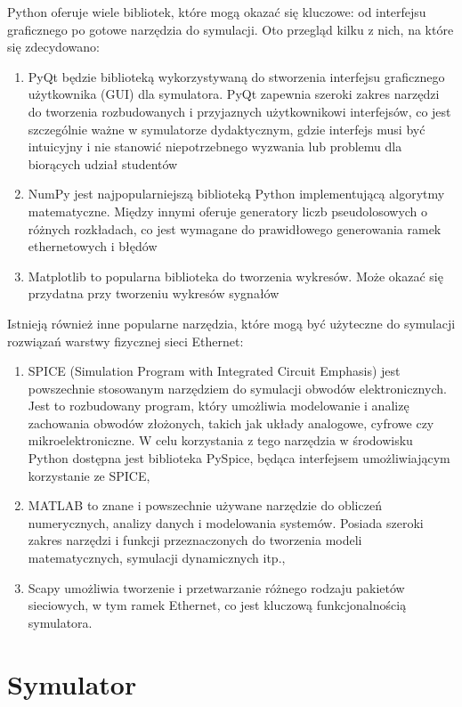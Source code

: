 Python oferuje wiele bibliotek, które mogą okazać się kluczowe: od interfejsu graficznego po gotowe narzędzia do symulacji. Oto przegląd kilku z nich, na które się zdecydowano:

\begin{enumerate}
    \item PyQt będzie biblioteką wykorzystywaną do stworzenia interfejsu graficznego użytkownika (GUI) dla symulatora. PyQt zapewnia szeroki zakres narzędzi do tworzenia rozbudowanych i przyjaznych użytkownikowi interfejsów, co jest szczególnie ważne w symulatorze dydaktycznym, gdzie interfejs musi być intuicyjny i nie stanowić niepotrzebnego wyzwania lub problemu dla biorących udział studentów
    \item NumPy jest najpopularniejszą biblioteką Python implementującą algorytmy matematyczne. Między innymi oferuje generatory liczb pseudolosowych o różnych rozkładach, co jest wymagane do prawidłowego generowania ramek ethernetowych i błędów
    \item  Matplotlib to popularna biblioteka do tworzenia wykresów. Może okazać się przydatna przy tworzeniu wykresów sygnałów
\end{enumerate}


Istnieją również inne popularne narzędzia, które mogą być użyteczne do symulacji rozwiązań warstwy fizycznej sieci Ethernet:
\begin{enumerate}
    \item SPICE (Simulation Program with Integrated Circuit Emphasis) jest powszechnie stosowanym narzędziem do symulacji obwodów elektronicznych. Jest to rozbudowany program, który umożliwia modelowanie i analizę zachowania obwodów złożonych, takich jak układy analogowe, cyfrowe czy mikroelektroniczne. W celu korzystania z tego narzędzia w środowisku Python dostępna jest biblioteka PySpice, będąca interfejsem umożliwiającym korzystanie ze SPICE,
    \item MATLAB to znane i powszechnie używane narzędzie do obliczeń numerycznych, analizy danych i modelowania systemów. Posiada szeroki zakres narzędzi i funkcji przeznaczonych do tworzenia modeli matematycznych, symulacji dynamicznych itp.,
    \item Scapy umożliwia tworzenie i przetwarzanie różnego rodzaju pakietów sieciowych, w tym ramek Ethernet, co jest kluczową funkcjonalnością symulatora.
\end{enumerate}

\section{Symulator}
